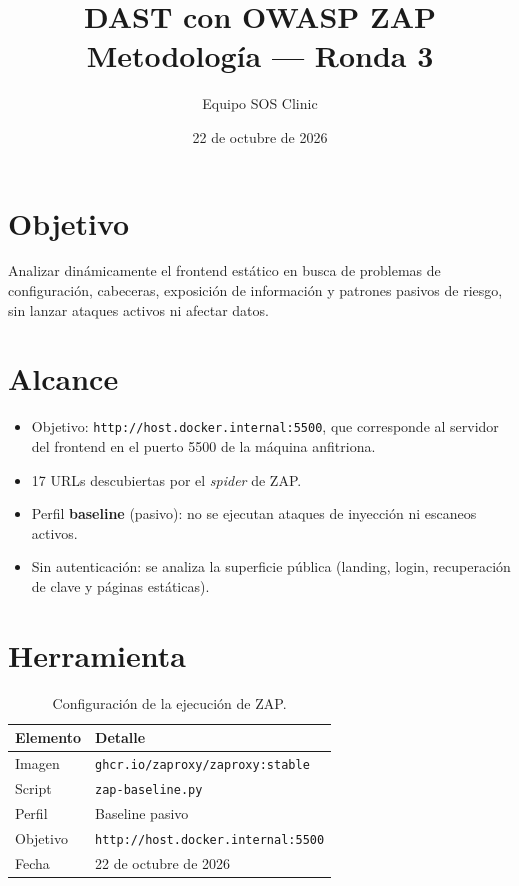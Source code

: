 \documentclass[11pt]{article}
\title{\textbf{DAST con OWASP ZAP}\\[0.3em]
\large Metodología --- Ronda 3}
\author{Equipo SOS Clinic}
\date{22 de octubre de 2026}
\begin{document}
\maketitle

\section{Objetivo}

Analizar dinámicamente el frontend estático en busca de problemas de
configuración, cabeceras, exposición de información y patrones pasivos de
riesgo, sin lanzar ataques activos ni afectar datos.

\section{Alcance}

\begin{itemize}
  \item Objetivo: \texttt{http://host.docker.internal:5500}, que corresponde al
  servidor del frontend en el puerto 5500 de la máquina anfitriona.
  \item 17 URLs descubiertas por el \textit{spider} de ZAP.
  \item Perfil \textbf{baseline} (pasivo): no se ejecutan ataques de inyección
  ni escaneos activos.
  \item Sin autenticación: se analiza la superficie pública (landing, login,
  recuperación de clave y páginas estáticas).
\end{itemize}

\section{Herramienta}

\begin{table}[h]
\centering
\small
\begin{tabular}{@{}ll@{}}
\toprule
Elemento & Detalle \\
\midrule
Imagen & \texttt{ghcr.io/zaproxy/zaproxy:stable} \\
Script & \texttt{zap-baseline.py} \\
Perfil & Baseline pasivo \\
Objetivo & \texttt{http://host.docker.internal:5500} \\
Fecha & 22 de octubre de 2026 \\
\bottomrule
\end{tabular}
\caption{Configuración de la ejecución de ZAP.}
\end{table}
\end{document}
